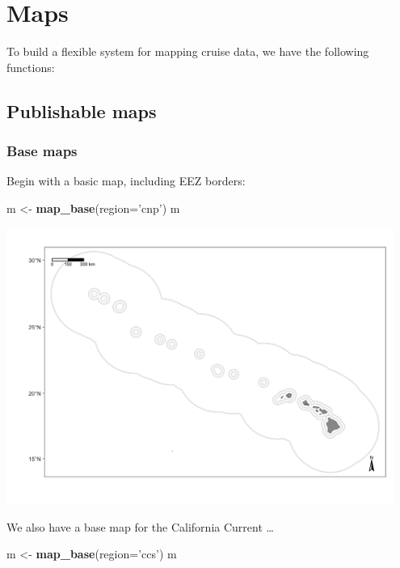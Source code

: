 \documentclass[
]{book}
\newenvironment{Shaded}{\begin{snugshade}}{\end{snugshade}}
\newcommand{\DataTypeTok}[1]{\textcolor[rgb]{0.13,0.29,0.53}{#1}}
\newcommand{\KeywordTok}[1]{\textcolor[rgb]{0.13,0.29,0.53}{\textbf{#1}}}
\newcommand{\NormalTok}[1]{#1}
\newcommand{\StringTok}[1]{\textcolor[rgb]{0.31,0.60,0.02}{#1}}
\begin{document}
\hypertarget{maps}{%
\chapter{Maps}\label{maps}}

To build a flexible system for mapping cruise data, we have the following functions:

\hypertarget{publishable-maps}{%
\section*{Publishable maps}\label{publishable-maps}}

\hypertarget{base-maps}{%
\subsection*{Base maps}\label{base-maps}}

Begin with a basic map, including EEZ borders:

\begin{Shaded}
\begin{Highlighting}[]
\NormalTok{m <-}\StringTok{ }\KeywordTok{map_base}\NormalTok{(}\DataTypeTok{region=}\StringTok{'cnp'}\NormalTok{)}
\NormalTok{m}
\end{Highlighting}
\end{Shaded}

\includegraphics[width=0.95\textwidth,height=\textheight]{img/map_cnp.png}

We also have a base map for the California Current \ldots{}

\begin{Shaded}
\begin{Highlighting}[]
\NormalTok{m <-}\StringTok{ }\KeywordTok{map_base}\NormalTok{(}\DataTypeTok{region=}\StringTok{'ccs'}\NormalTok{)}
\NormalTok{m}
\end{Highlighting}
\end{Shaded}
\end{document}
